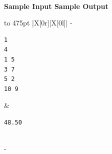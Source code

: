 \documentclass[a4paper,11pt]{article}
\begin{document}
\vspace{5mm}\\
\bf{Sample Input} \hspace{52mm} \bf{Sample Output}\vspace{1mm}\\
\begin{tabu*} to 475pt {|X[0r]|X[0l]|}
\tabucline-
\vspace{-\baselineskip} %
\begin{Verbatim}
1
4
1 5
3 7
5 2
10 9
\end{Verbatim}
&
\vspace{-\baselineskip} %
\begin{Verbatim}
48.50
\end{Verbatim}
\\
\tabucline-
\end{tabu*}
\end{document}

